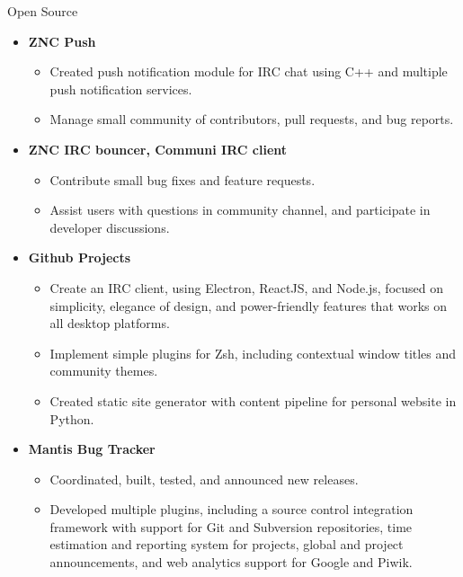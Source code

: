 \documentclass[11pt,oneside]{article}
\newenvironment{ressection}[1]{
    \vspace{8pt}
    {\fontfamily{phv}\selectfont\Large#1}
    \begin{itemize}
    \vspace{3pt}
}{
    \end{itemize}
}
\newcommand{\resitem}[1]{
    \vspace{-4pt}
    \item \begin{flushleft} #1 \end{flushleft}
}
\newcommand{\ressubitem}[1]{
    \vspace{-1pt}
    \item \begin{flushleft} #1 \end{flushleft}
}
\newenvironment{reslist}[1]{
    \resitem{\textbf{#1}}
    \vspace{-2pt}
    \begin{itemize}
}{
    \end{itemize}
}
\begin{document}
\begin{ressection}{Open Source}

    \begin{reslist}{ZNC Push}
        \ressubitem{Created push notification module for IRC chat using C++ and multiple push notification services.}
        \ressubitem{Manage small community of contributors, pull requests, and bug reports.}
    \end{reslist}

    \begin{reslist}{ZNC IRC bouncer, Communi IRC client}
        \ressubitem{Contribute small bug fixes and feature requests.}
        \ressubitem{Assist users with questions in community channel, and participate in developer discussions.}
    \end{reslist}

    \begin{reslist}{Github Projects}
        \ressubitem{Create an IRC client, using Electron, ReactJS, and Node.js, focused on simplicity, elegance
            of design, and power-friendly features that works on all desktop platforms.}
        \ressubitem{Implement simple plugins for Zsh, including contextual window titles and community themes.}
        \ressubitem{Created static site generator with content pipeline for personal website in Python.}
    \end{reslist}

    \begin{reslist}{Mantis Bug Tracker}
        \ressubitem{Coordinated, built, tested, and announced new releases.}
        \ressubitem{Developed multiple plugins, including a source control integration framework
        with support for Git and Subversion repositories, time estimation and reporting system for projects,
        global and project announcements, and web analytics support for Google and Piwik.}
    \end{reslist}



\end{ressection}
\end{document}

